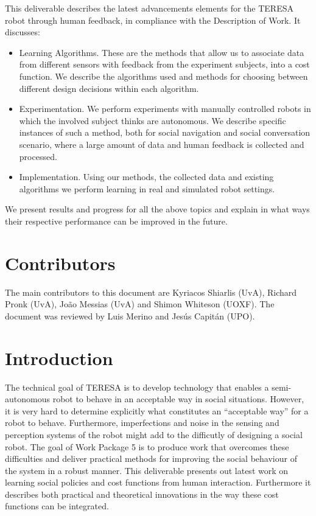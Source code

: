 \documentclass[a4paper,11pt]{report}
\begin{document}
This deliverable describes the latest advancements 
elements for the TERESA robot through human feedback, in compliance with the 
Description of Work. It discusses:

\begin{itemize}
  \item Learning Algorithms. These are the methods that allow us to associate data from different sensors with feedback from the experiment subjects, into a cost function. We describe the algorithms used and methods for choosing between different design decisions within each algorithm.
  \item Experimentation. We perform experiments with manually 
controlled robots in which the involved subject thinks are autonomous. We describe 
specific instances of such a method, both for social navigation and social conversation scenario, where a 
  large amount of data and human feedback is collected and processed.
  \item Implementation. Using our methods, the collected data and existing algorithms we perform learning in real and simulated robot settings.
\end{itemize}

We present results and progress for all the above topics and explain in what 
ways their respective performance can be improved in the future.

\section{Contributors}\label{sec:cont}

The main contributors to this document are Kyriacos Shiarlis (UvA), Richard Pronk (UvA), Jo\~{a}o Messias (UvA) and Shimon Whiteson (UOXF). The document was reviewed by Luis Merino and Jes\'{u}s Capit\'{a}n (UPO).

\newpage

\section{Introduction}\label{sec:intro}

The technical goal of TERESA is to develop technology that enables a semi-autonomous robot to behave in an acceptable way in social situations. However, it is very hard to determine explicitly what constitutes an “acceptable way” for a robot to behave. Furthermore, imperfections and noise in the sensing and perception systems of the robot might add to the difficutly of designing a social robot. The goal of Work Package 5 is to produce work that overcomes these difficulties and deliver practical methods for improving the social behaviour of the system in a robust manner. This deliverable presents out latest work on learning social policies and cost functions from human interaction. Furthermore it describes both practical and theoretical innovations in the way these cost functions can be integrated.
\end{document}
